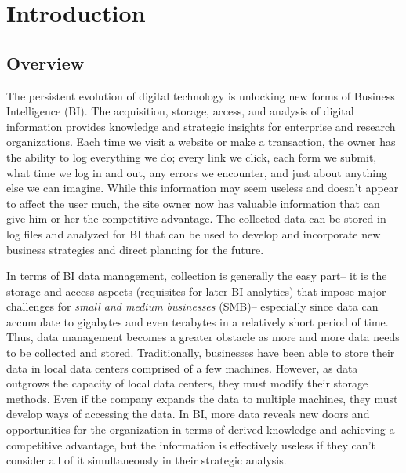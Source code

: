 %
%
\chapter{Introduction} \label{ch:intro}
\section{Overview}
The persistent evolution of digital technology is unlocking new forms of Business Intelligence (BI). The acquisition, storage, access, and analysis of digital information provides knowledge and strategic insights for enterprise and research organizations. Each time we visit a website or make a transaction, the owner has the ability to log everything we do; every link we click, each form we submit, what time we log in and out, any errors we encounter, and just about anything else we can imagine. While this information may seem useless and doesn't appear to affect the user much, the site owner now has valuable information that can give him or her the competitive advantage. The collected data can be stored in log files and analyzed for BI that can be used to develop and incorporate new business strategies and direct planning for the future.

In terms of BI data management, collection is generally the easy part-- it is the storage and access aspects (requisites for later BI analytics) that impose major challenges for \textit{small and medium businesses} (SMB)-- especially since data can accumulate to gigabytes and even terabytes in a relatively short period of time. Thus, data management becomes a greater obstacle as more and more data needs to be collected and stored. Traditionally, businesses have been able to store their data in local data centers comprised of a few machines. However, as data outgrows the capacity of local data centers, they must modify their storage methods. Even if the company expands the data to multiple machines, they must develop ways of accessing the data. In BI, more data reveals new doors and opportunities for the organization in terms of derived knowledge and achieving a competitive advantage, but the information is effectively useless if they can't consider all of it simultaneously in their strategic analysis.

